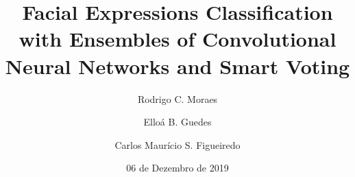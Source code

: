 \thispagestyle{empty}

\title[FEC with Ensembles of CNN and Smart Voting]{Facial Expressions Classification with Ensembles of
Convolutional Neural Networks and Smart Voting}

\author{Rodrigo C. Moraes \and Elloá B. Guedes \and Carlos Maurício S. Figueiredo}
\date{06 de Dezembro de 2019}